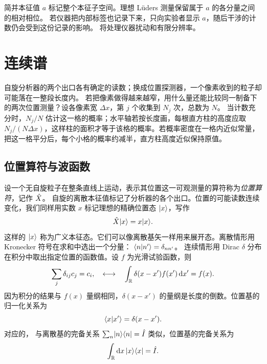\begin{remark}[相同读数下的仪器分辨能力]
    简并本征值 $a$ 标记整个本征子空间。理想 Lüders 测量保留属于 $a$ 的各分量之间的相对相位。
    若仪器把内部标签也记录下来，只向实验者显示 $a$，随后干涉的计数仍会受到这份记录的影响。
    将处理仪器扰动和有限分辨率。
\end{remark}

\section{连续谱}
\label{sec:continuous}
自旋分析器的两个出口各有确定的读数；换成位置探测器，一个像素收到的粒子却可能落在一整段长度内。
若把像素做得越来越窄，用什么量还能比较同一制备下的两次位置测量？设各像素宽 $\Delta x$，第 $j$ 个收集到 $N_j$ 次，总数为 $N$。
当计数充分时，$N_j/N$ 估计这一格的概率；水平轴若按长度画，每根直方柱的高度应取
$N_j/(N\Delta x)$，这样柱的面积才等于该格的概率。若概率密度在一格内近似常量，
把这一格平分后，每个小格的概率约减半，直方柱高度近似保持原值。

\subsection{位置算符与波函数}
设一个无自旋粒子在整条直线上运动，表示其位置这一可观测量的算符称为\emph{位置算符}，记作 $\hat{X}$。
自旋的离散本征值标记了分析器的各个出口。位置的可能读数连续变化，我们同样用实数 $x$ 标记理想的精确位置态 $\lvert x\rangle$，写作
\begin{equation}
    \hat{X}\lvert x\rangle = x\lvert x\rangle.
\end{equation}
这样的 $\lvert x\rangle$ 称为广义本征态。它们可以像离散基矢一样用来展开态。离散情形用 Kronecker 符号在求和中选出一个分量：
$\langle n\vert n'\rangle = \delta_{nn'}$。
连续情形用 Dirac $\delta$ 分布在积分中取出指定位置的函数值。设 $f$ 为光滑试验函数，则
\begin{equation}\label{eq:qm-delta-sifting}
    \sum_j\delta_{ij}c_j = c_i,
    \quad \longleftrightarrow \quad
    \int_{\mathbb{R}}\delta(x - x')f(x')\mathop{}\!\mathrm{d} x' = f(x).
\end{equation}
因为积分的结果与 $f(x)$ 量纲相同，$\delta(x - x')$ 的量纲是长度的倒数。位置基的归一化关系为
\begin{equation}
    \label{eq:qm-position-basis}
    \langle x\vert x'\rangle = \delta(x - x').
\end{equation}
对应的，
与离散基的完备关系
$\textstyle \sum_n \lvert n\rangle\langle n\rvert = \hat{I}$
类似，位置基的完备关系为
\begin{equation}
    \label{eq:qm-position-completeness}
    \int_{\mathbb{R}}\mathop{}\!\mathrm{d} x\,\lvert x\rangle\langle x\rvert = \hat{I}.
\end{equation}

